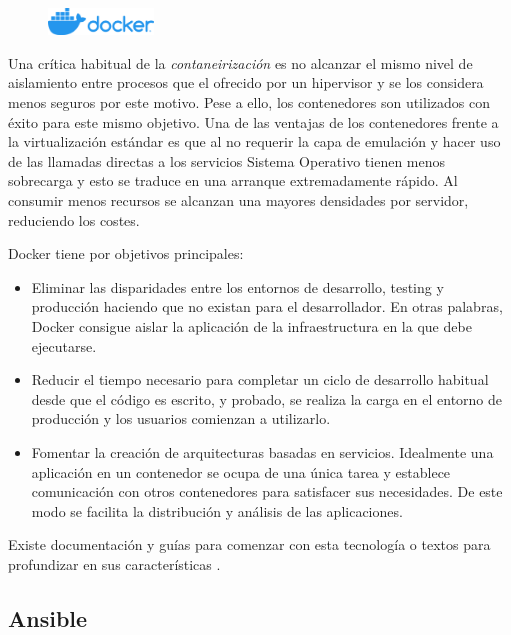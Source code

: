 \begin{figure}
    \centering
    \includegraphics[width=0.25\textwidth]{imaxes/e-fundamentos-tecnologicos/logo-docker.png}
\end{figure}

Una crítica habitual de la \emph{contaneirización} es no alcanzar el mismo nivel de aislamiento entre procesos que el ofrecido por un hipervisor y se los considera menos seguros por este motivo. Pese a ello, los contenedores son utilizados con éxito para este mismo objetivo. Una de las ventajas de los contenedores frente a la virtualización estándar es que al no requerir la capa de emulación y hacer uso de las llamadas directas a los servicios Sistema Operativo tienen menos sobrecarga y esto se traduce en una arranque extremadamente rápido. Al consumir menos recursos se alcanzan una mayores densidades por servidor, reduciendo los costes.

Docker tiene por objetivos principales:
\begin{itemize}
    \item Eliminar las disparidades entre los entornos de desarrollo, testing y producción haciendo que no existan para el desarrollador. En otras palabras, Docker consigue aislar la aplicación de la infraestructura en la que debe ejecutarse.
    \item Reducir el tiempo necesario para completar un ciclo de desarrollo habitual desde que el código es escrito, y probado, se realiza la carga en el entorno de producción y los usuarios comienzan a utilizarlo.
    \item Fomentar la creación de arquitecturas basadas en servicios. Idealmente una aplicación en un contenedor se ocupa de una única tarea y establece comunicación con otros contenedores para satisfacer sus necesidades. De este modo se facilita la distribución y análisis de las aplicaciones.
\end{itemize}

Existe documentación y guías para comenzar con esta tecnología \cite{dockerInc_web_startGuides} o textos para profundizar en sus características \cite{turnbull_book_dockerBook}.

\subsection{Ansible}

